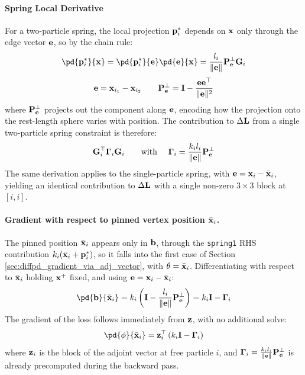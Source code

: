 \paragraph{Spring Local Derivative}
For a two-particle spring, the local projection $\mathbf{p}_i^*$ depends on $\mathbf{x}$ only through the edge vector $\mathbf{e}$, so by the chain rule:
\begin{equation}
\pd{\p_i^*}{\x} = \pd{\p_i^*}{\e} \pd{\e}{\x} = \frac{l_i}{\|\e\|}\mathbf{P}_{\e}^\perp \G_i
\end{equation}
\begin{equation}
\mathbf{e} = \mathbf{x}_{i_1} - \mathbf{x}_{i_2} \qquad \mathbf{P}_{\mathbf{e}}^\perp = \mathbf{I} - \frac{\mathbf{e}\mathbf{e}^\top}{\|\mathbf{e}\|^2}
\end{equation}
where $\mathbf{P}_{\mathbf{e}}^\perp$ projects out the component along $\mathbf{e}$, encoding how the projection onto the rest-length sphere varies with position. The contribution to $\Delta \mathbf{L}$ from a single two-particle spring constraint is therefore:
\begin{equation}
     \mathbf{G}_i^\top \boldsymbol{\Gamma}_i\mathbf{G}_i
    \qquad \text{with } \quad
    \boldsymbol{\Gamma}_i = \frac{k_i l_i}{\|\mathbf{e}\|}\mathbf{P}_{\mathbf{e}}^\perp
\end{equation}
The same derivation applies to the single-particle spring, with $\mathbf{e} = \mathbf{x}_i - \bar{\mathbf{x}}_i$, yielding an identical contribution to $\Delta\mathbf{L}$ with a single non-zero $3\times 3$ block at $[i,i]$.

\paragraph{Gradient with respect to pinned vertex position $\bar{\mathbf{x}}_i$.} The pinned position $\bar{\mathbf{x}}_i$ appears only in $\mathbf{b}$, through the  \texttt{spring1} RHS contribution $k_i(\bar{\mathbf{x}}_i + \mathbf{p}_i^*)$,  so it falls into the first case of Section \ref{sec:diffpd_gradient_via_adj_vector}, with $\theta = \bar{\mathbf{x}}_i$.  Differentiating with respect to $\bar{\mathbf{x}}_i$ holding $\mathbf{x}^+$ fixed, and using $\mathbf{e} = \mathbf{x}_i - \bar{\mathbf{x}}_i$:
\begin{equation}
    \pd{\bb}{\bar{\x}_i}
    =
    k_i\left(\I - \frac{l_i}{\|\e\|}\mathbf{P}_{\e}^\perp\right)
    =
    k_i\I - \boldsymbol{\Gamma}_i
\end{equation}
The gradient of the loss follows immediately from $\mathbf{z}$, with no additional solve:
\begin{equation}
    \pd{\phi}{\bar{\x}_i}
    =
    \z_i^\top
    \left(
        k_i\I - \boldsymbol{\Gamma}_i
    \right)
\end{equation}
where $\mathbf{z}_i$ is the block of the adjoint vector at free particle $i$,  and $\boldsymbol{\Gamma}_i = \frac{k_i l_i}{\|\mathbf{e}\|}\mathbf{P}_{\mathbf{e}}^\perp$  is already precomputed during the backward pass.

